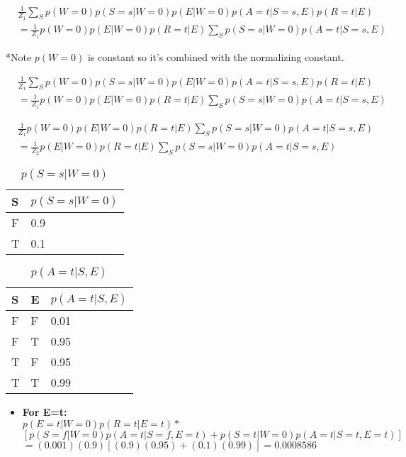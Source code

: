 \documentclass{article}
\begin{document}
\begin{enumerate}[label=(\alph*)]
\begin{enumerate}[label=\roman*.]
\begin{align*}
&\frac{1}{Z_1}\sum_S p(W=0)p(S=s|W=0)p(E|W=0)p(A=t|S=s,E)p(R=t|E) \\
&= \frac{1}{Z_1}p(W=0)p(E|W=0)p(R=t|E)\sum_S p(S=s|W=0)p(A=t|S=s,E)
\end{align*}

*Note $p(W=0)$ is constant so it's combined with the normalizing constant.

\begin{align*}
&\frac{1}{Z_1}\sum_S p(W=0)p(S=s|W=0)p(E|W=0)p(A=t|S=s,E)p(R=t|E) \\
&= \frac{1}{Z_1}p(W=0)p(E|W=0)p(R=t|E)\sum_S p(S=s|W=0)p(A=t|S=s,E)
\end{align*}


\begin{align*}
& \frac{1}{Z_1}p(W=0)p(E|W=0)p(R=t|E)\sum_S p(S=s|W=0)p(A=t|S=s,E) \\
&= \frac{1}{Z_2}p(E|W=0)p(R=t|E)\sum_S p(S=s|W=0)p(A=t|S=s,E)
\end{align*}

\begin{table}[h]
\centering
\caption{$p(S=s|W=0)$}
\label{table:tbla}
\begin{tabular}{|l|l|}
\hline
 S & $p(S=s|W=0)$   \\
\hline \hline
 F & 0.9  \\
 T & 0.1  \\
\hline
\end{tabular}
\end{table}

\begin{table}[h]
\centering
\caption{$p(A=t|S,E)$}
\label{table:tblb}
\begin{tabular}{|l|l|l|}
\hline
 S & E & $p(A=t|S,E)$   \\
\hline \hline
 F & F & 0.01  \\
 F & T & 0.95  \\
 T & F & 0.95  \\
 T & T & 0.99 \\
\hline
\end{tabular}
\end{table}

\begin{itemize}

\item \textbf{For E=t:} \\
$p(E=t|W=0)p(R=t|E=t)*$ \\
$[p(S=f|W=0)p(A=t|S=f,E=t)+p(S=t|W=0)p(A=t|S=t,E=t)]$ \\
$=(0.001)(0.9)[(0.9)(0.95)+(0.1)(0.99)]=0.0008586$


\end{itemize}
\end{enumerate}
\end{enumerate}
\end{document}
